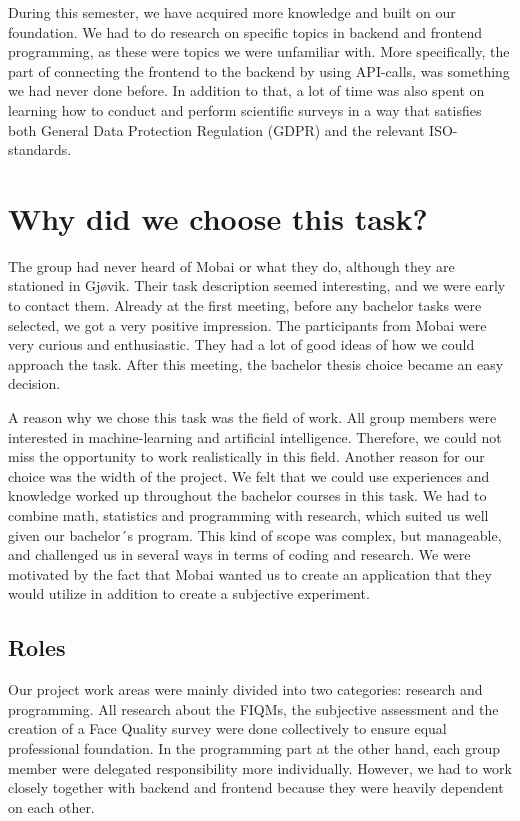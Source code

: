 During this semester, we have acquired more knowledge and built on our foundation. We had to do research on specific topics in backend and frontend programming, as these were topics we were unfamiliar with. More specifically, the part of connecting the frontend to the backend by using API-calls, was something we had never done before. In addition to that, a lot of time was also spent on learning how to conduct and perform scientific surveys in a way that satisfies both General Data Protection Regulation (GDPR) and the relevant ISO-standards.  

\section{Why did we choose this task?}
The group had never heard of Mobai or what they do, although they are stationed in Gjøvik. Their task description seemed interesting, and we were early to contact them. Already at the first meeting, before any bachelor tasks were selected, we got a very positive impression. The participants from Mobai were very curious and enthusiastic. They had a lot of good ideas of how we could approach the task. After this meeting, the bachelor thesis choice became an easy decision. 

A reason why we chose this task was the field of work. All group members were interested in machine-learning and artificial intelligence. Therefore, we could not miss the opportunity to work realistically in this field. Another reason for our choice was the width of the project. We felt that we could use experiences and knowledge worked up throughout the bachelor courses in this task. We had to combine math, statistics and programming with research, which suited us well given our bachelor´s program. This kind of scope was complex, but manageable, and challenged us in several ways in terms of coding and research. We were motivated by the fact that Mobai wanted us to create an application that they would utilize in addition to create a subjective experiment.   

\subsection{Roles}
\label{subsec:roles}
Our project work areas were mainly divided into two categories: research and programming. All research about the FIQMs, the subjective assessment and the creation of a Face Quality survey were done collectively to ensure equal professional foundation. In the programming part at the other hand, each group member were delegated responsibility more individually. However, we had to work closely together with backend and frontend because they were heavily dependent on each other.  


